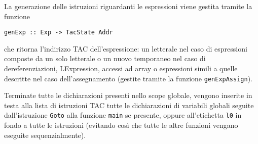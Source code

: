
La generazione delle istruzioni riguardanti le espressioni viene gestita tramite la funzione
\begin{center}
    {\tt genExp :: Exp -> TacState Addr} 
\end{center}
che ritorna l'indirizzo TAC dell'espressione: un letterale nel caso di espressioni composte da un solo letterale o un nuovo temporaneo nel caso di dereferenziazioni, LExpression, accessi ad array o espressioni simili a quelle descritte nel caso dell'assegnamento (gestite tramite la funzione {\tt genExpAssign}).


Terminate tutte le dichiarazioni presenti nello scope globale, vengono inserite in testa alla lista di istruzioni TAC tutte le dichiarazioni di variabili globali seguite dall'istruzione {\tt Goto} alla funzione {\tt main} se presente, oppure all'etichetta {\tt l0} in fondo a tutte le istruzioni (evitando così che tutte le altre funzioni vengano eseguite sequenzialmente).